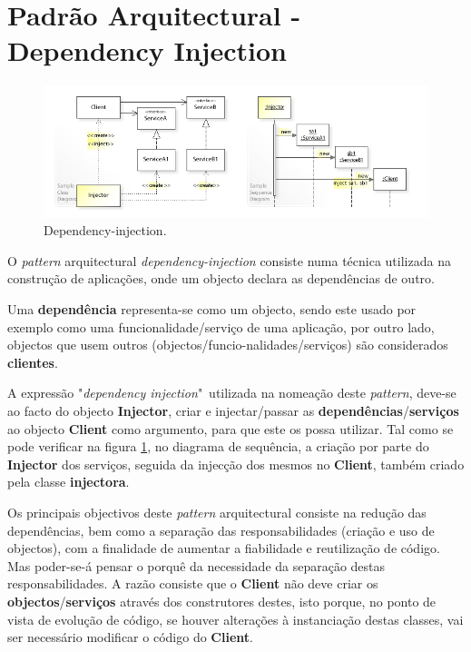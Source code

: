 \section{Padrão Arquitectural - Dependency Injection}
\label{sec:dependency}

\begin{figure}[H]
    \centering
    \includegraphics[scale=0.6]{images/dependency-injection.jpg}
    \caption{Dependency-injection.}
    \label{fig:dependency-injection}
\end{figure}

\hspace{3mm}O \textit{pattern} arquitectural \textit{dependency-injection} consiste numa técnica utilizada na construção de aplicações, onde um objecto declara as dependências de outro. 

Uma \textbf{dependência} representa-se como um objecto, sendo este usado por exemplo como uma funcionalidade/serviço de uma aplicação, por outro lado, objectos que usem outros (objectos/funcio-nalidades/serviços) são considerados \textbf{clientes}.

A expressão "\textit{dependency injection}"\ utilizada na nomeação deste \textit{pattern}, deve-se ao facto do objecto \textbf{Injector}, criar e injectar/passar as \textbf{dependências}/\textbf{serviços} ao objecto \textbf{Client} como argumento, para que este os possa utilizar. Tal como se pode verificar na figura \ref{fig:dependency-injection}, no diagrama de sequência, a criação por parte do \textbf{Injector} dos serviços, seguida da injecção dos mesmos no \textbf{Client}, também criado pela classe \textbf{injectora}.

Os principais objectivos deste \textit{pattern} arquitectural consiste na redução das dependências, bem como a separação das responsabilidades (criação e uso de objectos), com a finalidade de aumentar a fiabilidade e reutilização de código. Mas poder-se-á pensar o porquê da necessidade da separação destas responsabilidades. A razão consiste que o \textbf{Client} não deve criar os \textbf{objectos}/\textbf{serviços} através dos construtores destes, isto porque, no ponto de vista de evolução de código, se houver alterações à instanciação destas classes, vai ser necessário modificar o código do \textbf{Client}. 

